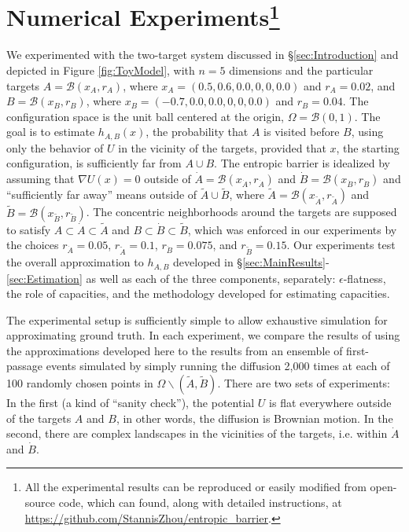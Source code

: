 \documentclass[12pt, nofootinbib,english, amsmath, amssymb, aps, priprint, graphicx,floatfix]{revtex4-1}
\theoremstyle{plain}
\theoremstyle{definition}
\theoremstyle{plain}
\newcommand{\bb}[1]{\mathcal{B}\left(#1\right)}
\newcommand{\dA}{{\dot A}}
\newcommand{\tA}{{\tilde A}}
\newcommand{\dB}{{\dot B}}
\newcommand{\tB}{{\tilde B}}
\begin{document}
 \section{Numerical Experiments\footnote{All the experimental results can be reproduced or easily modified from open-source code, which can found, along with detailed instructions, at \url{https://github.com/StannisZhou/entropic_barrier}.}}
\label{sec:Experiments}
We experimented with the two-target system discussed in \S\ref{sec:Introduction} and depicted in Figure \ref{fig:ToyModel}, with $n=5$ dimensions 
and the particular targets $A=\bb{x_A, r_A}$,  where $x_A=(0.5,0.6,0.0,0,0,0.0)$ and $r_A=0.02$, and 
$B=\bb{x_B, r_B}$,  where $x_B=(-0.7,0.0,0.0,0,0,0.0)$ and $r_B=0.04$. The configuration space is the unit ball centered at 
the origin, $\Omega=\bb{0,1}$. 
The goal is to estimate $h_{A,B}(x)$, the probability that $A$ is visited before $B$, using only the behavior of $U$ in the vicinity of the targets, provided that $x$, the starting configuration, is sufficiently far from $A\cup B$. The entropic barrier is idealized by assuming that $\nabla U(x)=0$ outside of $\dA=\bb{x_\dA, r_\dA}$ and $\dB=\bb{x_\dB, r_\dB}$ and ``sufficiently far away'' means outside of $\tA \cup \tB$, where $\tA=\bb{x_\tA, r_\tA}$ and $\tB=\bb{x_\tB, r_\tB}$. The concentric neighborhoods around the targets are supposed to satisfy $A\subset\dA\subset\tA$ and 
$B\subset\dB\subset\tB$, which was enforced in our experiments by the choices $r_\dA= 0.05$, $r_\tA=0.1$, $r_\dB=0.075$, and
$r_\tB=0.15$.
Our experiments test the overall approximation to $h_{A,B}$ developed in \S\ref{sec:MainResults}-\ref{sec:Estimation} as well as each of the three components, separately: $\epsilon$-flatness, the role of capacities, and the methodology developed for estimating capacities.

The experimental setup is sufficiently simple to allow
exhaustive simulation for approximating ground truth. In each experiment, we compare the results of using the approximations developed here to the results from an ensemble of first-passage events simulated by simply running the diffusion 2,000 times at each of 100 randomly chosen points in $\Omega\backslash (\tA,\tB)$. There are two sets of experiments: In the first (a kind of ``sanity check''), the potential $U$ is flat everywhere outside of the targets $A$ and $B$, in other words, the diffusion is Brownian motion. In the second, there are complex landscapes in the vicinities of the targets, i.e. within $\dA$ and $\dB$.
\end{document}
